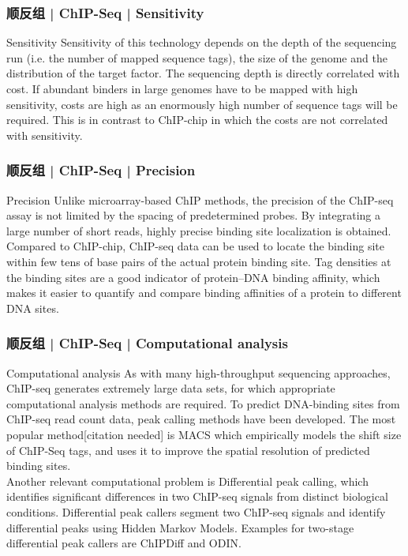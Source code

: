 \begin{frame}
  \frametitle{顺反组 | ChIP-Seq | Sensitivity}
  \begin{block}{Sensitivity}
    Sensitivity of this technology depends on the depth of the sequencing run (i.e. the number of mapped sequence tags), the size of the genome and the distribution of the target factor. The sequencing depth is directly correlated with cost. If abundant binders in large genomes have to be mapped with high sensitivity, costs are high as an enormously high number of sequence tags will be required. This is in contrast to ChIP-chip in which the costs are not correlated with sensitivity.
  \end{block}
\end{frame}

\begin{frame}
  \frametitle{顺反组 | ChIP-Seq | Precision}
  \begin{block}{Precision}
    Unlike microarray-based ChIP methods, the precision of the ChIP-seq assay is not limited by the spacing of predetermined probes. By integrating a large number of short reads, highly precise binding site localization is obtained. Compared to ChIP-chip, ChIP-seq data can be used to locate the binding site within few tens of base pairs of the actual protein binding site. Tag densities at the binding sites are a good indicator of protein–DNA binding affinity, which makes it easier to quantify and compare binding affinities of a protein to different DNA sites.
  \end{block}
\end{frame}

\begin{frame}
  \frametitle{顺反组 | ChIP-Seq | Computational analysis}
  \begin{block}{Computational analysis}
    As with many high-throughput sequencing approaches, ChIP-seq generates extremely large data sets, for which appropriate computational analysis methods are required. To predict DNA-binding sites from ChIP-seq read count data, peak calling methods have been developed. The most popular method[citation needed] is MACS which empirically models the shift size of ChIP-Seq tags, and uses it to improve the spatial resolution of predicted binding sites.\\
    \vspace{1em}
    Another relevant computational problem is Differential peak calling, which identifies significant differences in two ChIP-seq signals from distinct biological conditions. Differential peak callers segment two ChIP-seq signals and identify differential peaks using Hidden Markov Models. Examples for two-stage differential peak callers are ChIPDiff and ODIN.
  \end{block}
\end{frame}

